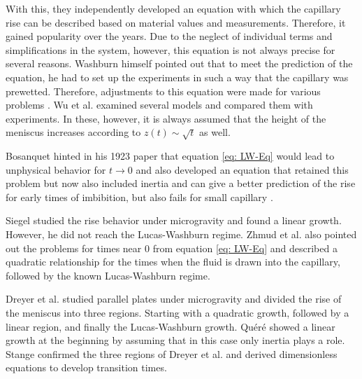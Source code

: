 With this, they independently developed an equation with which the capillary rise can be described based on material values and measurements. Therefore, it gained popularity over the years. Due to the neglect of individual terms and simplifications in the system, however, this equation is not always precise for several reasons. Washburn himself pointed out that to meet the prediction of the equation, he had to set up the experiments in such a way that the capillary was prewetted. Therefore, adjustments to this equation were made for various problems \cite{dimitrov2007CapillaryRiseNanopores, heiranian2022ModifiedLucasWashburnTheory,cai2021LucasWashburnEquationBased,fries2008AnalyticSolutionCapillary,fricke2023AnalyticalStudyCapillary,delannoy2019DualRoleViscosity,martic2002MolecularDynamicsSimulation}. Wu et al. \cite{wu2017CapillaryRiseValidity} examined several models and compared them with experiments. In these, however, it is always assumed that the height of the meniscus increases according to $z(t)\sim \sqrt{t}$ as well.

Bosanquet \cite{bosanquet1923LVFlowLiquids} hinted in his 1923 paper that equation \ref{eq: LW-Eq} would lead to unphysical behavior for $t\xrightarrow{}0$ and also developed an equation that retained this problem but now also included inertia and can give a better prediction of the rise for early times of imbibition, but also fails for small capillary \cite{chen2023InvestigatingValidityBosanquet}. 

Siegel \cite{siegel1961TransientCapillaryRise} studied the rise behavior under microgravity and found a linear growth. However, he did not reach the Lucas-Washburn regime. Zhmud et al. \cite{zhmud2000DynamicsCapillaryRise} also pointed out the problems for times near $0$ from equation \ref{eq: LW-Eq} and described a quadratic relationship for the times when the fluid is drawn into the capillary, followed by the known Lucas-Washburn regime.

Dreyer et al. \cite{dreyer1994CapillaryRiseLiquid} studied parallel plates under microgravity and divided the rise of the meniscus into three regions. Starting with a quadratic growth, followed by a linear region, and finally the Lucas-Washburn growth. Quéré \cite{quere1997InertialCapillarity} showed a linear growth at the beginning by assuming that in this case only inertia plays a role. Stange \cite{stange2003CapillaryDrivenFlow} confirmed the three regions of Dreyer et al. \cite{dreyer1994CapillaryRiseLiquid} and derived dimensionless equations to develop transition times.

